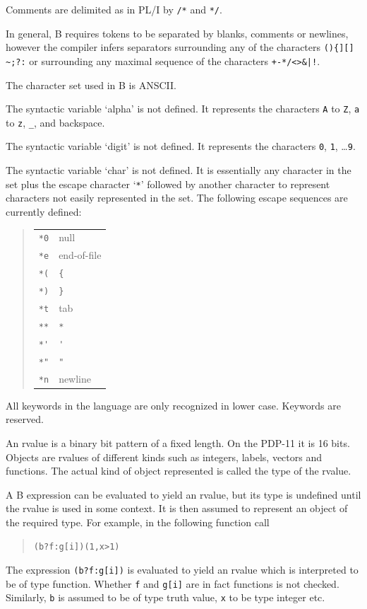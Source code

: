 \documentclass[12pt]{report}
\begin{document}

Comments are delimited as in PL/I by \verb|/*| and \verb|*/|.

In general, B requires tokens to be separated by blanks, comments or
newlines, however the compiler infers separators surrounding any of
the characters \verb|(){][] ~;?:| or surrounding any maximal sequence
of the characters \verb$+-*/<>&|!$.

The character set used in B is ANSCII.

The syntactic variable `alpha' is not defined.  It represents the
characters \verb|A| to \verb|Z|, \verb|a| to \verb|z|, \verb|_|, and
backspace.

The syntactic variable `digit' is not defined.  It represents the
characters \verb|0|, \verb|1|, \ldots \verb|9|.

The syntactic variable `char' is not defined.  It is essentially any
character in the set plus the escape character `\verb|*|' followed by
another character to represent characters not easily represented in
the set.  The following escape sequences are currently defined:
\begin{quote}
\begin{tabular}{ll}
  \verb|*0| & null \\
  \verb|*e| & end-of-file \\
  \verb|*(| & \verb|{| \\
  \verb|*)| & \verb|}| \\
  \verb|*t| & tab \\
  \verb|**| & \verb|*| \\
  \verb|*'| & \verb|'| \\
  \verb|*"| & \verb|"| \\
  \verb|*n| & newline
\end{tabular}
\end{quote}

All keywords in the language are only recognized in lower case.
Keywords are reserved.


An rvalue is a binary bit pattern of a fixed length.  On the PDP-11 it
is 16 bits.  Objects are rvalues of different kinds such as integers,
labels, vectors and functions. The actual kind of object represented
is called the type of the rvalue.

A B expression can be evaluated to yield an rvalue, but its type is
undefined until the rvalue is used in some context.  It is then assumed
to represent an object of the required type.  For example, in the
following function call
\begin{quote}
  \verb|(b?f:g[i])(1,x>1)|
\end{quote}
The expression \verb|(b?f:g[i])| is evaluated to yield an rvalue which
is interpreted to be of type function.  Whether \verb|f| and
\verb|g[i]| are in fact functions is not checked.  Similarly, \verb|b| is
assumed to be of type truth value, \verb|x| to be type integer etc.
\end{document}
